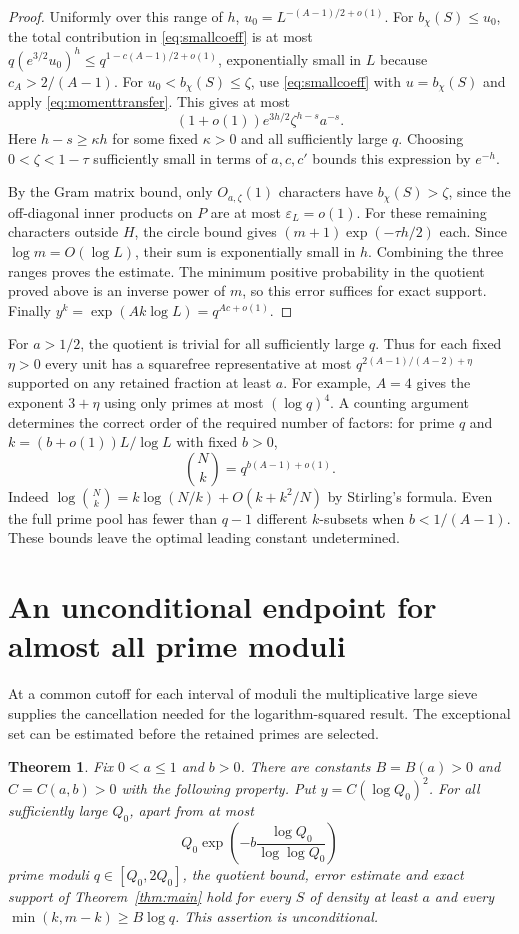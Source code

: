 \documentclass[11pt]{article}
\newtheorem{theorem}{Theorem}[section]
\renewcommand{\epsilon}{\varepsilon}
\begin{document}
\begin{proof}
Uniformly over this range of $h$,
$u_0=L^{-(A-1)/2+o(1)}$. For $b_\chi(S)\le u_0$, the
total contribution in \eqref{eq:smallcoeff} is at most
$q(e^{3/2}u_0)^h\le q^{1-c(A-1)/2+o(1)}$, exponentially small in
$L$ because $c_A>2/(A-1)$.
For $u_0<b_\chi(S)\le\zeta$, use \eqref{eq:smallcoeff} with
$u=b_\chi(S)$ and apply \eqref{eq:momenttransfer}. This gives at most
\[
 (1+o(1))e^{3h/2}\zeta^{h-s}a^{-s}.
\]
Here $h-s\ge\kappa h$ for some fixed $\kappa>0$ and all sufficiently
large $q$. Choosing $0<\zeta<1-\tau$ sufficiently small in terms of
$a,c,c'$ bounds this expression by $e^{-h}$.

By the Gram matrix bound, only $O_{a,\zeta}(1)$ characters have
$b_\chi(S)>\zeta$, since the off-diagonal inner products on $P$ are
at most $\epsilon_L=o(1)$. For these remaining characters outside $H$,
the circle bound gives $(m+1)\exp(-\tau h/2)$ each. Since $\log m=O(\log L)$,
their sum is exponentially small in $h$. Combining the three ranges proves
the estimate. The minimum positive probability in the quotient proved
above is an inverse power of $m$, so this error suffices for exact
support. Finally $y^k=\exp(Ak\log L)=q^{Ac+o(1)}$.
\end{proof}

For $a>1/2$, the quotient is trivial for all sufficiently large $q$.
Thus for each fixed $\eta>0$ every unit has a squarefree representative
at most $q^{2(A-1)/(A-2)+\eta}$ supported on any retained fraction
at least $a$. For example, $A=4$ gives the exponent $3+\eta$ using
only primes at most $(\log q)^4$. A counting argument determines the
correct order of the required number of factors: for prime $q$ and
$k=(b+o(1))L/\log L$ with fixed $b>0$,
\[
 \binom Nk=q^{b(A-1)+o(1)}.
\]
Indeed $\log\binom Nk=k\log(N/k)+O(k+k^2/N)$ by Stirling's formula.
Even the full prime pool has fewer than $q-1$ different $k$-subsets
when $b<1/(A-1)$. These bounds leave the optimal leading constant undetermined.
\section{An unconditional endpoint for almost all prime moduli}
\label{sec:large-sieve}

At a common cutoff for each interval of moduli the multiplicative large sieve
supplies the cancellation needed for the logarithm-squared result.  The
exceptional set can be estimated before the retained primes are selected.

\begin{theorem}\label{thm:density-endpoint}
Fix $0<a\le1$ and $b>0$. There are constants $B=B(a)>0$ and $C=C(a,b)>0$
with the following property. Put $y=C(\log Q_0)^2$. For all sufficiently
large $Q_0$, apart from at most
\[
 Q_0\exp\!\left(-b\frac{\log Q_0}{\log\log Q_0}\right)
\]
prime moduli $q\in[Q_0,2Q_0]$, the quotient bound, error estimate and exact
support of Theorem~\ref{thm:main} hold for every $S$ of density at least
$a$ and every $\min(k,m-k)\ge B\log q$. This assertion is unconditional.
\end{theorem}
\end{document}
